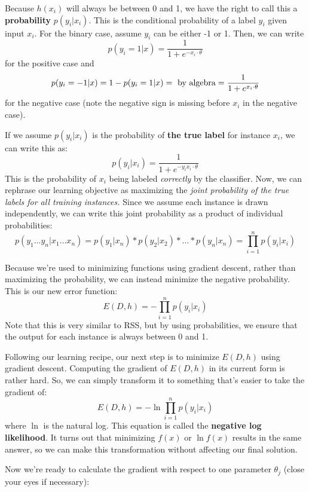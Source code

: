 \documentclass{article}
\begin{document}
Because $h(x_i)$ will always be between 0 and 1, we have the right to
call this a {\bf probability} $p(y_i|x_i)$.  This is the conditional
probability of a label $y_i$ given input $x_i$. For the binary case,
assume $y_i$ can be either -1 or 1. Then, we can write
$$
p(y_i=1|x) = \frac{1}{1 + e^{-x_i \cdot \theta}}
$$
for the positive case and
$$
p(y_i=-1|x) = 1 - p(y_i=1|x) = \hbox{ by algebra} = \frac{1}{1 + e^{x_i \cdot \theta}}
$$
for the negative case (note the negative sign is missing before $x_i$ in the negative case).

If we assume $p(y_i|x_i)$ is the probability of {\bf the true label}
for instance $x_i$, we can write this as:
$$
p(y_i|x_i) =  \frac{1}{1 + e^{-y_ix_i \cdot \theta}}
$$ This is the probability of $x_i$ being labeled {\sl correctly} by
the classifier. Now, we can rephrase our learning objective as
maximizing the {\sl joint probability of the true labels for all
  training instances.} Since we assume each instance is drawn
independently, we can write this joint probability as a product of
individual probabilities:
$$
p(y_1 \ldots y_n|x_1 \ldots x_n) = p(y_1|x_n) * p(y_2|x_2) * \ldots * p(y_n|x_n) = \prod_{i=1}^{n}p(y_i|x_i)
$$

Because we're used to minimizing functions using gradient descent, rather than maximizing the probability, we can instead minimize the negative probability. This is our new error function:
$$
E(D, h) = - \prod_{i=1}^{n}p(y_i|x_i)
$$
Note that this is very similar to RSS, but by using probabilities, we ensure that the output for each instance is always between 0 and 1.

Following our learning recipe, our next step is to minimize $E(D,h)$
using gradient descent. Computing the gradient of $E(D,h)$ in its current form is rather hard. So, we can simply transform it to something that's easier to take the gradient of:
$$
E(D,h) = - \ln \prod_{i=1}^n  p(y_i|x_i)
$$ where $\ln$ is the natural log. This equation is called the {\bf
  negative log likelihood}. It turns out that minimizing $f(x)$ or
$\ln f(x)$ results in the same answer, so we can make this
transformation without affecting our final solution.

Now we're ready to calculate the gradient with respect to one parameter $\theta_j$ (close your eyes if necessary):
\end{document}
